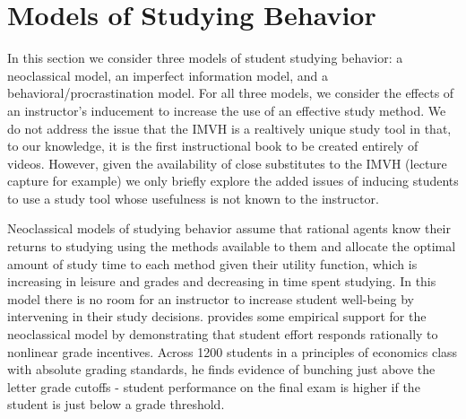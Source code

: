 \documentclass[12pt]{article}
\begin{document}

\section{Models of Studying Behavior}

In this section we consider three models of student studying behavior: a neoclassical model, an imperfect information model, and a behavioral/procrastination model. For all three models, we consider the effects of an instructor's inducement to increase the use of an effective study method. We do not address the issue that the IMVH is a realtively unique study tool in that, to our knowledge, it is the first instructional book to be created entirely of videos. However, given the availability of close substitutes to the IMVH (lecture capture for example) we only briefly explore the added issues of inducing students to use a study tool whose usefulness is not known to the instructor.

Neoclassical models of studying behavior assume that rational agents know their returns to studying using the methods available to them and allocate the optimal amount of study time to each method given their utility function, which is increasing in leisure and grades and decreasing in time spent studying. In this model there is no room for an instructor to increase student well-being by intervening in their study decisions. \textcite{oettinger2002} provides some empirical support for the neoclassical model by demonstrating that student effort responds rationally to nonlinear grade incentives. Across 1200 students in a principles of economics class with absolute grading standards, he finds evidence of bunching just above the letter grade cutoffs - student performance on the final exam is higher if the student is just below a grade threshold.%
\end{document}

